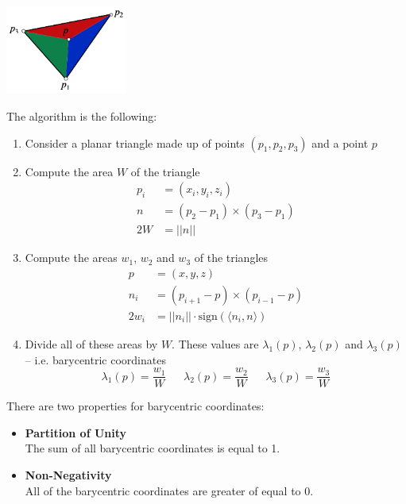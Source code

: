 \documentclass{article}
\begin{document}
\begin{center}
	\includegraphics[width=4cm]{barycentric_coords.png}
\end{center}
The algorithm is the following:

\begin{enumerate}
	\item Consider a planar triangle made up of points $(p_1, p_2, p_3)$ and a point $p$
	\item Compute the area $W$ of the triangle
	\begin{align*}
		p_i &= (x_i, y_i, z_i) \\
		n &= (p_2 - p_1) \times (p_3 - p_1) \\
		2W &= ||n||
	\end{align*}		
	\item Compute the areas $w_1$, $w_2$ and $w_3$ of the triangles
	\begin{align*}
		p &= (x, y, z) \\
		n_i &= (p_{i+1} - p) \times (p_{i-1} - p) \\
		2w_i &= ||n_i|| \cdot \text{sign}(\langle n_i, n \rangle)
	\end{align*}
	\item Divide all of these areas by $W$. These values are $\lambda_1(p)$, $\lambda_2(p)$ and $\lambda_3(p)$ -- i.e. barycentric coordinates
	\[ \lambda_1(p) = \frac{w_1}{W} ~~~~~~~ \lambda_2(p) = \frac{w_2}{W} ~~~~~~~ \lambda_3(p) = \frac{w_3}{W} \]
\end{enumerate}
There are two properties for barycentric coordinates:

\begin{itemize}
	\item \textbf{Partition of Unity}
	\vspace{.2cm} \\
	The sum of all barycentric coordinates is equal to 1.
	
	\item \textbf{Non-Negativity}
	\vspace{.2cm} \\
	All of the barycentric coordinates are greater of equal to 0.
\end{itemize}
\end{document}
